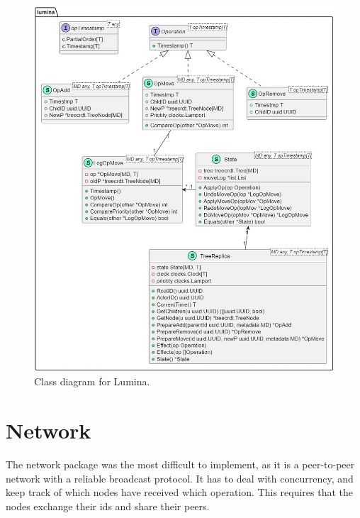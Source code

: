 \documentclass[12pt]{report}
\begin{document}
\begin{figure}[H]
    \centering
    \includegraphics[width=1\textwidth]{images/lumina_impl.jpg} 
    \caption{Class diagram for Lumina.}
    \label{fig:maram_impl} 
\end{figure} 

\section{Network}
The network package was the most difficult to implement, as it is a peer-to-peer network with a reliable broadcast protocol. It has to deal with concurrency, and keep track of which nodes have received which operation. This requires that the nodes exchange their ids and share their peers. \par
\end{document}
